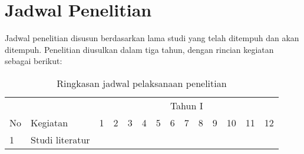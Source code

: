 \section[Jadwal Penelitian]{Jadwal Penelitian}
\begin{spacing}{1.5}
	Jadwal penelitian disusun berdasarkan lama studi yang telah ditempuh dan akan ditempuh. Penelitian diusulkan dalam tiga tahun, dengan rincian kegiatan sebagai berikut:
	\begin{table}[htp]
		\caption{Ringkasan jadwal pelaksanaan penelitian}
		\label{tab:jad-pen}
		\begin{tabular}{|l|l|llllllllllll|}
			\hline
			\multicolumn{1}{|c|}{}                     &                                                                                      & \multicolumn{12}{c|}{Tahun I}                                                                                                                                                                                                                                                                                                                                                                                                                                                                                                                                            \\ \cline{3-14} 
			\multicolumn{1}{|c|}{\multirow{-2}{*}{No}} & \multirow{-2}{*}{Kegiatan}                                                           & \multicolumn{1}{c|}{1}                        & \multicolumn{1}{c|}{2}                        & \multicolumn{1}{c|}{3}                        & \multicolumn{1}{c|}{4}                        & \multicolumn{1}{c|}{5}                        & \multicolumn{1}{c|}{6}                        & \multicolumn{1}{c|}{7}                        & \multicolumn{1}{c|}{8}                        & \multicolumn{1}{c|}{9}                        & \multicolumn{1}{c|}{10}                       & \multicolumn{1}{c|}{11}                       & \multicolumn{1}{c|}{12}  \\ \hline
			1                                          & Studi literatur                                                                      & \multicolumn{1}{l|}{\cellcolor[HTML]{343434}} & \multicolumn{1}{l|}{\cellcolor[HTML]{343434}} & \multicolumn{1}{l|}{\cellcolor[HTML]{343434}} & \multicolumn{1}{l|}{\cellcolor[HTML]{343434}} & \multicolumn{1}{l|}{}                         & \multicolumn{1}{l|}{}                         & \multicolumn{1}{l|}{}                         & \multicolumn{1}{l|}{}                         & \multicolumn{1}{l|}{}                         & \multicolumn{1}{l|}{}                         & \multicolumn{1}{l|}{}                         &                          \\ \hline

\end{tabular}
\end{table}
\end{spacing}
